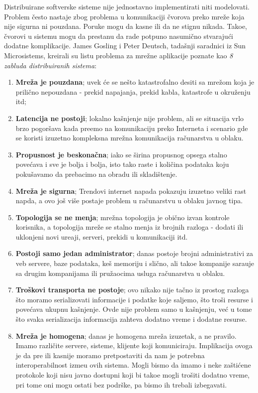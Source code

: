 Distribuirane softverske sisteme nije jednostavno implementirati niti modelovati. Problem \v cesto nastaje zbog problema u komunikaciji \v cvorova preko mre\v ze koja nije sigurna ni pouzdana. Poruke mogu da kasne ili da ne stignu nikada. Tako\dj e, \v cvorovi u sistemu mogu da prestanu da rade potpuno nasumi\v cno stvaraju\'ci dodatne komplikacije. James Gosling i Peter Deutsch, tada\v snji saradnici iz Sun Microsistems, kreirali su listu problema za mre\v zne aplikacije poznate kao \textit{8 zabluda distribuiranih sistema}:

\begin{enumerate}[start=1,label={(\bfseries \arabic*)}]
	\item \textbf{Mre\v za je pouzdana}; uvek \'ce se ne\v sto katastrofalno desiti sa mre\v zom koja je prili\v cno nepouzdana - prekid napajanja, prekid kabla, katastrofe u okru\v zenju itd;
	\item \textbf{Latencija ne postoji}; lokalno ka\v snjenje nije problem, ali se situacija vrlo brzo pogor\v sava kada pre\dj emo na komunikaciju preko Interneta i scenario gde se koristi izuzetno kompleksna mre\v zna komunikacija ra\v cunarstva u oblaku.
	\item \textbf {Propusnost je beskona\v cna}; iako se \v sirina propusnog opsega stalno pove\'cava i sve je bolja i bolja, isto tako raste i koli\v cina podataka koju poku\v savamo da prebacimo na obradu ili skladi\v stenje.
	\item \textbf {Mre\v za je sigurna}; Trendovi internet napada pokazuju izuzetno veliki rast napda, a ovo jo\v s vi\v se postaje problem u ra\v cunarstvu u oblaku javnog tipa.
	\item \textbf {Topologija se ne menja}; mre\v zna topologija je obi\v cno izvan kontrole korisnika, a topologija mre\v ze se stalno menja iz brojnih razloga - dodati ili uklonjeni novi ure\dj aji, serveri, prekidi u komunikaciji itd.
	\item \textbf {Postoji samo jedan administrator}; danas postoje brojni administrativi za veb servere, baze podataka, ke\v s memoriju i sli\v cno, ali tako\dj e kompanije sara\dj uje sa drugim kompanijama ili pru\v zaocima usluga ra\v cunarstva u oblaku.
	\item \textbf {Tro\v skovi transporta ne postoje}; ovo nikako nije ta\v cno iz prostog razloga \v sto moramo serializovati informacije i podatke koje saljemo, \v sto tro\v si resurse i pove\'cava ukupnu ka\v snjenje. Ovde nije problem samo u ka\v snjenju, ve\'c u tome \v sto  svaka serializacija informacija zahteva dodatno vreme i dodatne resurse.
	\item \textbf {Mre\v za je homogena}; danas je homogena mre\v za izuzetak, a ne pravilo. Imamo razli\v cite servere, sisteme, klijente koji komuniciraju. Implikacija ovoga je da pre ili kasnije moramo pretpostaviti da nam je potrebna interoperabilnost izme\dj u ovih sistema. Mogli bismo da imamo i neke za\v sti\'cene protokole koji nisu javno dostupni koji bi tako\dj e mogli tro\v siti dodatno vreme, pri tome oni mogu ostati bez podrške, pa bismo ih trebali izbegavati.
\end{enumerate}

